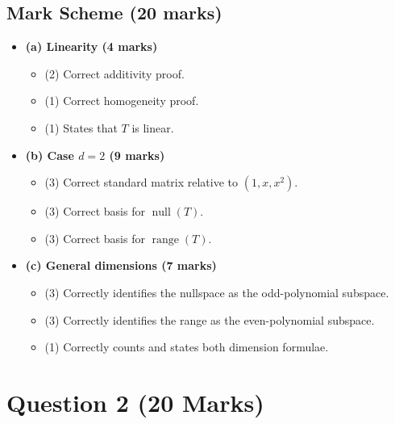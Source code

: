 \documentclass[12pt]{article}
\newcommand{\Null}{\operatorname{null}}
\newcommand{\Range}{\operatorname{range}}
\begin{document}
\subsection{Mark Scheme (20 marks)}
\begin{itemize}[leftmargin=1.6em]
  \item \textbf{(a) Linearity (4 marks)}
  \begin{itemize}[leftmargin=1.6em]
    \item (2) Correct additivity proof.
    \item (1) Correct homogeneity proof.
    \item (1) States that $T$ is linear.
  \end{itemize}
  \item \textbf{(b) Case $d=2$ (9 marks)}
  \begin{itemize}[leftmargin=1.6em]
    \item (3) Correct standard matrix relative to $(1,x,x^2)$.
    \item (3) Correct basis for $\Null(T)$.
    \item (3) Correct basis for $\Range(T)$.
  \end{itemize}
  \item \textbf{(c) General dimensions (7 marks)}
  \begin{itemize}[leftmargin=1.6em]
    \item (3) Correctly identifies the nullspace as the odd-polynomial subspace.
    \item (3) Correctly identifies the range as the even-polynomial subspace.
    \item (1) Correctly counts and states both dimension formulae.
  \end{itemize}
\end{itemize}

\newpage
\section{Question 2 \hfill (20 Marks)}
\end{document}
